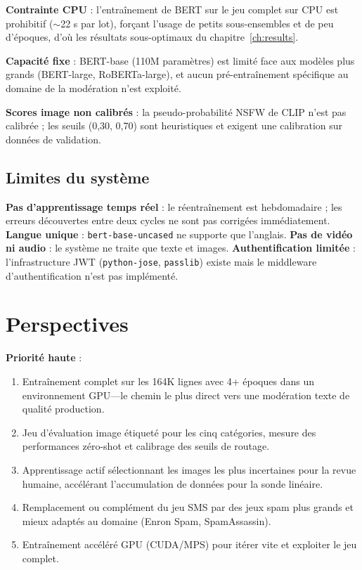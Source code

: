 \textbf{Contrainte CPU} : l'entraînement de BERT sur le jeu complet sur CPU est prohibitif ($\sim$22 s par lot), forçant l'usage de petits sous-ensembles et de peu d'époques, d'où les résultats sous-optimaux du chapitre~\ref{ch:results}.

\textbf{Capacité fixe} : BERT-base (110M paramètres) est limité face aux modèles plus grands (BERT-large, RoBERTa-large), et aucun pré-entraînement spécifique au domaine de la modération n'est exploité.

\textbf{Scores image non calibrés} : la pseudo-probabilité NSFW de CLIP n'est pas calibrée ; les seuils (0,30, 0,70) sont heuristiques et exigent une calibration sur données de validation.

\subsection{Limites du système}

\textbf{Pas d'apprentissage temps réel} : le réentraînement est hebdomadaire ; les erreurs découvertes entre deux cycles ne sont pas corrigées immédiatement. \textbf{Langue unique} : \texttt{bert-base-uncased} ne supporte que l'anglais. \textbf{Pas de vidéo ni audio} : le système ne traite que texte et images. \textbf{Authentification limitée} : l'infrastructure JWT (\texttt{python-jose}, \texttt{passlib}) existe mais le middleware d'authentification n'est pas implémenté.

\section{Perspectives}

\textbf{Priorité haute} :
\begin{enumerate}[nosep]
  \item Entraînement complet sur les 164K lignes avec 4+ époques dans un environnement GPU---le chemin le plus direct vers une modération texte de qualité production.
  \item Jeu d'évaluation image étiqueté pour les cinq catégories, mesure des performances zéro-shot et calibrage des seuils de routage.
  \item Apprentissage actif sélectionnant les images les plus incertaines pour la revue humaine, accélérant l'accumulation de données pour la sonde linéaire.
  \item Remplacement ou complément du jeu SMS par des jeux spam plus grands et mieux adaptés au domaine (Enron Spam, SpamAssassin).
  \item Entraînement accéléré GPU (CUDA/MPS) pour itérer vite et exploiter le jeu complet.
\end{enumerate}

